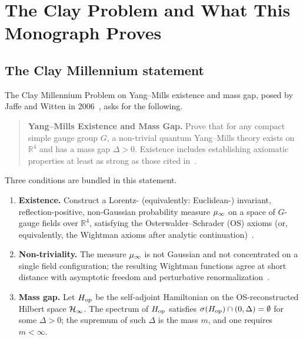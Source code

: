 %

\chapter{The Clay Problem and What This Monograph Proves}
\label{ch:introduction}

\section{The Clay Millennium statement}
\label{sec:clay-statement}

%
The Clay Millennium Problem on Yang--Mills existence and mass gap,
posed by Jaffe and Witten in 2006~\cite{JaffeWitten2006}, asks for
the following.

\begin{quote}
\textbf{Yang--Mills Existence and Mass Gap.}  Prove that for any
compact simple gauge group $G$, a non-trivial quantum Yang--Mills
theory exists on $\mathbb{R}^4$ and has a mass gap $\Delta > 0$.
Existence includes establishing axiomatic properties at least as
strong as those cited in~\cite{StreaterWightman2000,
OsterwalderSchrader1973}.
\end{quote}

Three conditions are bundled in this statement.

\begin{enumerate}[label=(C\arabic*)]
  \item \textbf{Existence.}  Construct a Lorentz- (equivalently:
    Euclidean-) invariant, reflection-positive, non-Gaussian
    probability measure $\mu_\infty$ on a space of $G$-gauge fields over
    $\mathbb{R}^4$, satisfying the Osterwalder--Schrader (OS) axioms
    (or, equivalently, the Wightman axioms after analytic
    continuation)~\cite{OsterwalderSchrader1973,GlimmJaffe1987}.
  \item \textbf{Non-triviality.}  The measure $\mu_\infty$ is not
    Gaussian and not concentrated on a single field configuration;
    the resulting Wightman functions agree at short distance with
    asymptotic freedom and perturbative
    renormalization~\cite{JaffeWitten2006}.
  \item \textbf{Mass gap.}  Let $H_{\mathrm{op}}$ be the self-adjoint
    Hamiltonian on the OS-reconstructed Hilbert space $\mathcal{H}_\infty$.  The
    spectrum of $H_{\mathrm{op}}$ satisfies $\sigma(H_{\mathrm{op}}) \cap (0, \Delta) =
    \emptyset$ for some $\Delta > 0$; the supremum of such $\Delta$
    is the mass $m$, and one requires $m < \infty$.
\end{enumerate}

